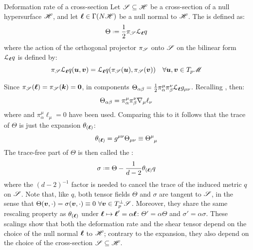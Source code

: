\begin{definition}{Deformation rate of a cross-section}{}
  Let $ \mathscr{S} \subseteq \mathscr{H} $ be a cross-section of a null hypersurface $ \mathscr{H} $, and let $ \boldsymbol{\ell} \in \Gamma(N \mathscr{H}) $ be a null normal to $ \mathscr{H} $. The  is defined as:
  \begin{equation}
    \Theta \defeq \frac{1}{2} \pi_\crs \ld_{\nn} q
  \end{equation}
  where the action of the orthogonal projector $ \pi_\mathscr{S} $ onto $ \mathscr{S} $ on the bilinear form $ \EuScript{L}_{\boldsymbol{\ell}} q $ is defined by:
  \begin{equation}
    \pi_\mathscr{S} \EuScript{L}_{\boldsymbol{\ell}} q (\boldsymbol{u} , \boldsymbol{v}) = \EuScript{L}_{\boldsymbol{\ell}} q(\pi_\mathscr{S}(\boldsymbol{u}) , \pi_\mathscr{S}(\boldsymbol{v}))
    \quad
    \forall \boldsymbol{u} , \boldsymbol{v} \in T_p\mathscr{M}
  \end{equation}
\end{definition}

Since $ \pi_\mathscr{S}(\boldsymbol{\ell}) = \pi_\mathscr{S}(\boldsymbol{k}) = \boldsymbol{0} $, in components $ \Theta_{\alpha \beta} = \frac{1}{2} \pi^\mu_\alpha \pi^\nu_\beta \EuScript{L}_{\boldsymbol{\ell}} g_{\mu \nu} $. Recalling , then:
\begin{equation}
  \Theta_{\alpha \beta} = \pi^\mu_\alpha \pi^\nu_\beta \nabla_\mu \ell_\nu
\end{equation}
where  and $ \pi^\mu_\alpha \ell_\mu = 0 $ have been used. Comparing this to  it follows that the trace of $ \Theta $ is just the expansion $ \theta_{(\boldsymbol{\ell})} $:
\begin{equation}
  \theta_{(\nn)} = g^{\mu \nu} \Theta_{\mu \nu} \equiv \tensor{\Theta}{^\mu_\mu}
\end{equation}
The trace-free part of $ \Theta $ is then called the :
\begin{equation}
  \sigma \defeq \Theta - \frac{1}{d - 2} \theta_{(\nn)} q
\end{equation}
where the $ (d-2)^{-1} $ factor is needed to cancel the trace of the induced metric $ q $ on $ \mathscr{S} $. Note that, like $ q $, both tensor fields $ \Theta $ and $ \sigma $ are tangent to $ \mathscr{S} $, in the sense that $ \Theta(\boldsymbol{v} , \cdot) = \sigma(\boldsymbol{v} , \cdot) \equiv 0 \,\,\forall \boldsymbol{v} \in T_p^\perp \mathscr{S} $. Moreover, they share the same rescaling property as $ \theta_{(\boldsymbol{\ell})} $ under $ \boldsymbol{\ell} \mapsto \boldsymbol{\ell}' = \alpha \boldsymbol{\ell} $: $ \Theta' = \alpha \Theta $ and $ \sigma' = \alpha \sigma $. These scalings show that both the deformation rate and the shear tensor depend on the choice of the null normal $ \boldsymbol{\ell} $ to $ \mathscr{H} $; contrary to the expansion, they also depend on the choice of the cross-section $ \mathscr{S} \subseteq \mathscr{H} $.

